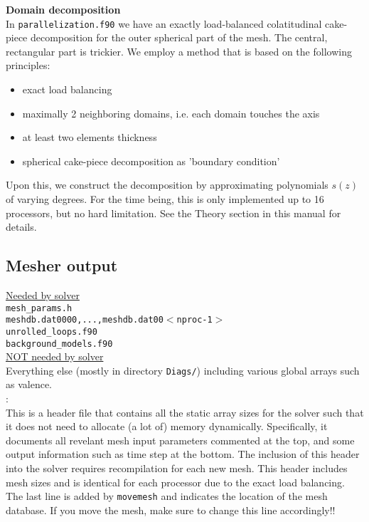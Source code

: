 \documentclass[11pt,letter,fleqn,english,notitlepage]{article}
\begin{document}
\noindent\textbf{Domain decomposition }\\
In {\tt parallelization.f90} we have an exactly load-balanced colatitudinal cake-piece decomposition 
for the outer spherical part of the mesh. The central, rectangular part is trickier. 
We employ a method that is based on the following principles:
\begin{itemize}
\item exact load balancing 
\item maximally 2 neighboring domains, i.e. each domain touches the axis
\item at least two elements thickness
\item spherical cake-piece decomposition as 'boundary condition'
\end{itemize}
Upon this, we construct the decomposition by approximating polynomials $s(z)$
of varying degrees. For the time being, this is only implemented up to 
16 processors, but no hard limitation. See the Theory section in this manual for details.

\subsection{Mesher output}
\underline{Needed by solver} \\
{\tt mesh\_params.h}\\
{\tt meshdb.dat0000,...,meshdb.dat00$<$nproc-1$>$}\\
{\tt unrolled\_loops.f90}\\
{\tt background\_models.f90}\\

\noindent\underline{NOT needed by solver }\\
Everything else (mostly in directory {\tt Diags/}) including various global 
arrays such as valence.\\

: \\
This is a header file that contains all the static array 
sizes for the solver such that it does not need to allocate (a lot of) 
memory dynamically. Specifically, it documents all revelant mesh input 
parameters commented at the top, and some output information such as 
time step at the bottom.  The inclusion of this header into the solver 
requires recompilation for each new mesh. This header includes 
mesh sizes and is identical for each processor due to the exact load balancing.
The last line is added by {\tt movemesh} and indicates the location of the mesh 
database. If you move the mesh, make sure to change this line accordingly!!
\\
\end{document}
